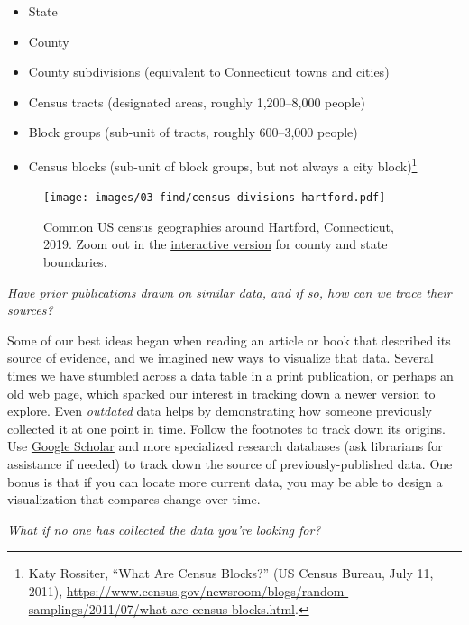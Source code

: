 \documentclass[
  english,
]{book}
\providecommand{\tightlist}{%
  \setlength{\itemsep}{0pt}\setlength{\parskip}{0pt}}
\begin{document}
\begin{itemize}
\tightlist
\item
  State
\item
  County
\item
  County subdivisions (equivalent to Connecticut towns and cities)
\item
  Census tracts (designated areas, roughly 1,200--8,000 people)
\item
  Block groups (sub-unit of tracts, roughly 600--3,000 people)
\item
  Census blocks (sub-unit of block groups, but not always a city block)\footnote{Katy Rossiter, {``What Are Census Blocks?''} ({US Census Bureau}, July 11, 2011), \url{https://www.census.gov/newsroom/blogs/random-samplings/2011/07/what-are-census-blocks.html}.}
\end{itemize}



\begin{figure}
\centering
\texttt{[image: images/03-find/census-divisions-hartford.pdf]}
\caption{\label{fig:census-divisions-hartford}Common US census geographies around Hartford, Connecticut, 2019. Zoom out in the \href{https://handsondataviz.github.io/census-divisions-hartford/}{interactive version} for county and state boundaries.}
\end{figure}

\emph{Have prior publications drawn on similar data, and if so, how can we trace their sources?}

Some of our best ideas began when reading an article or book that described its source of evidence, and we imagined new ways to visualize that data. Several times we have stumbled across a data table in a print publication, or perhaps an old web page, which sparked our interest in tracking down a newer version to explore. Even \emph{outdated} data helps by demonstrating how someone previously collected it at one point in time. Follow the footnotes to track down its origins. Use \href{https://google.com/scholar}{Google Scholar} and more specialized research databases (ask librarians for assistance if needed) to track down the source of previously-published data. One bonus is that if you can locate more current data, you may be able to design a visualization that compares change over time.

\emph{What if no one has collected the data you're looking for?}
\end{document}

